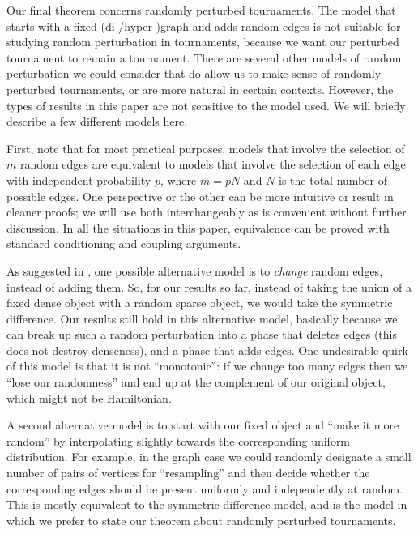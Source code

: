 \documentclass[11pt,english]{article}
\theoremstyle{plain}
\theoremstyle{definition}
\theoremstyle{definition}
\theoremstyle{plain}
\theoremstyle{plain}
\theoremstyle{plain}
\theoremstyle{plain}
\theoremstyle{remark}
\theoremstyle{remark}
\begin{document}
Our final theorem concerns randomly perturbed tournaments. The model
that starts with a fixed \mbox{(di-/hyper-)}graph and adds random
edges is not suitable for studying random perturbation in tournaments,
because we want our perturbed tournament to remain a tournament. There
are several other models of random perturbation we could consider
that do allow us to make sense of randomly perturbed tournaments,
or are more natural in certain contexts. However, the types of results
in this paper are not sensitive to the model used. We will briefly
describe a few different models here.

First, note that for most practical purposes, models that involve
the selection of $m$ random edges are equivalent to models that involve
the selection of each edge with independent probability $p$, where
$m=pN$ and $N$ is the total number of possible edges. One perspective or the other can be more intuitive
or result in cleaner proofs; we will use both interchangeably as is
convenient without further discussion. In all the situations in this
paper, equivalence can be proved with standard conditioning and coupling
arguments.

As suggested in \cite[Definition~1]{ST03}, one possible alternative
model is to \emph{change} random edges, instead of adding them. So,
for our results so far, instead of taking the union of a fixed dense
object with a random sparse object, we would take the symmetric difference.
Our results still hold in this alternative model, basically because
we can break up such a random perturbation into a phase that deletes
edges (this does not destroy denseness), and a phase that adds edges.
One undesirable quirk of this model is that it is not ``monotonic'':
if we change too many edges then we ``lose our randomness'' and
end up at the complement of our original object, which might not be
Hamiltonian.

A second alternative model is to start with our fixed object and ``make
it more random'' by interpolating slightly towards the corresponding
uniform distribution. For example, in the graph case we could randomly
designate a small number of pairs of vertices for ``resampling''
and then decide whether the corresponding edges should be present
uniformly and independently at random. This is mostly equivalent to
the symmetric difference model, and is the model in which we prefer
to state our theorem about randomly perturbed tournaments.
\end{document}
